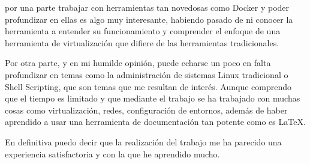 	por una parte trabajar con herramientas tan novedosas como Docker  y poder profundizar en ellas es algo muy interesante, habiendo pasado de ni conocer la herramienta a entender su funcionamiento y comprender el enfoque de una herramienta de virtualización que difiere de las herramientas tradicionales.
	
	Por otra parte, y en mi humilde opinión, puede echarse un poco en falta profundizar en temas como la administración de sistemas Linux tradicional o Shell Scripting, que son temas que me resultan de interés. Aunque comprendo que el tiempo es limitado y que mediante el trabajo se ha trabajado con muchas cosas como virtualización, redes, configuración de entornos, además de haber aprendido a usar una herramienta de documentación tan potente como es \LaTeX.
	
	En definitiva puedo decir que la realización del trabajo me ha parecido una experiencia satisfactoria y con la que he aprendido mucho.